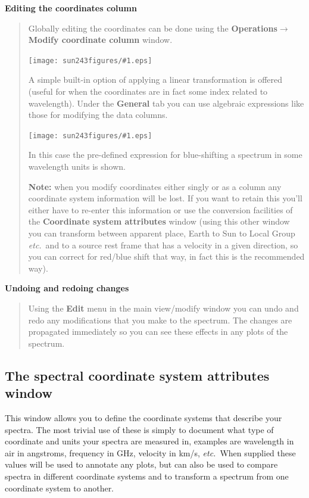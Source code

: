\documentclass[twoside,11pt]{article}
\newcommand{\htmladdimg}[1]{}
\newcommand{\latexhtml}[2]{#1}
\renewcommand{\_}{\texttt{\symbol{95}}}
\newcommand{\mainfigure}[1]
{\begin{center}
 \latexhtml{\texttt{[image: sun243\_figures/\#1.eps]}}{\htmladdimg{#1.gif}}
 \end{center}
}
\newcommand{\menuitem}[1]{\textbf{#1}}
\newcommand{\submenuitem}[2]{\latexhtml{\textbf{#1$\rightarrow$#2}}{\textbf{#1->#2}}}
\newcommand{\labelitem}[1]{\textbf{#1}}
\newcommand{\etc}{\textit{etc.}}
\newcommand{\subheading}[1]{\textbf{\large{#1}}}
\begin{document}
\subheading{Editing the coordinates column}
\begin{quote}
 Globally editing the coordinates can be done using the
 \submenuitem{Operations}{Modify coordinate column} window.

 \mainfigure{coordeditwindow}

 A simple built-in option of applying a linear transformation is
 offered (useful for when the coordinates are in fact some index
 related to wavelength). Under the \labelitem{General} tab you can
 use algebraic expressions like those for modifying the data columns.

 \mainfigure{coordeditwindow2}

 In this case the pre-defined expression for blue-shifting a spectrum
 in some wavelength units is shown.

 \labelitem{Note:} when you modify coordinates either singly or as a
 column any coordinate system information will be lost. If you want to
 retain this you'll either have to re-enter this information or use
 the conversion facilities of the \labelitem{Coordinate system
 attributes} window (using this other window you can transform between
 apparent place, Earth to Sun to Local Group \etc\ and to a source
 rest frame that has a velocity in a given direction, so you can
 correct for red/blue shift that way, in fact this is the recommended way).

\end{quote}

\subheading{Undoing and redoing changes}
\begin{quote}
Using the \menuitem{Edit} menu in the main view/modify window you can
undo and redo any modifications that you make to the spectrum. The
changes are propagated immediately so you can see these effects in any
plots of the spectrum.
\end{quote}

\newpage
\subsection{The spectral coordinate system attributes window}

This window allows you to define the coordinate systems that describe your
spectra. The most trivial use of these is simply to document what type of
coordinate and units your spectra are measured in, examples are wavelength in
air in angstroms, frequency in GHz, velocity in km/s, \etc\ When supplied
these values will be used to annotate any plots, but can also be used to
compare spectra in different coordinate systems and to transform a spectrum
from one coordinate system to another.
\end{document}
